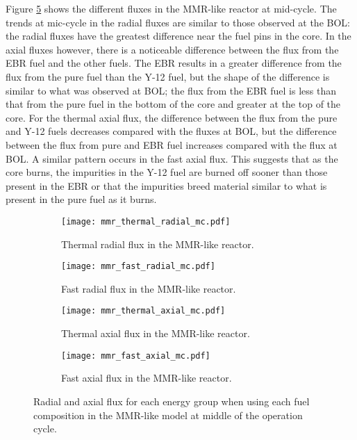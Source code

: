 Figure \ref{fig:mmr_mc} shows the different fluxes in the \gls{MMR}-like 
reactor at mid-cycle. The trends at mic-cycle in the radial fluxes are 
similar to those observed at the \gls{BOL}: the radial fluxes have the 
greatest difference near the fuel pins in the core. In the axial fluxes 
however, there is a noticeable difference between the flux from the \gls{EBR} 
fuel and the other fuels. The \gls{EBR} results in a greater difference 
from the flux from the pure fuel than the Y-12 fuel, but the shape of 
the difference is similar to what was observed at \gls{BOL}; the flux from 
the \gls{EBR} fuel is less than that from the pure fuel in the bottom of 
the core and greater at the top of the core. For the thermal axial flux, 
the difference between the flux from the pure and Y-12 fuels decreases 
compared with the fluxes at \gls{BOL}, but the difference between the flux 
from pure and \gls{EBR} fuel increases compared with the flux at \gls{BOL}. 
A similar pattern occurs in the fast axial flux. This suggests that 
as the core burns, the impurities in the Y-12 fuel are burned off sooner 
than those present in the \gls{EBR} or that the impurities breed material 
similar to what is present in the pure fuel as it burns. 

\begin{figure}
        \centering
        \begin{subfigure}[b]{0.48\textwidth}
            \centering
            \texttt{[image: mmr\_thermal\_radial\_mc.pdf]}
            \caption{Thermal radial flux in the \gls{MMR}-like reactor.}
            \label{fig:mmr_thermal_radial_mc}
        \end{subfigure}
        \hfill
        \begin{subfigure}[b]{0.48\textwidth}
            \centering
            \texttt{[image: mmr\_fast\_radial\_mc.pdf]}
            \caption{Fast radial flux in the \gls{MMR}-like reactor.}
            \label{fig:mmr_fast_radial_mc}
        \end{subfigure}
        \hfill
            
        \begin{subfigure}[b]{0.48\textwidth}
            \centering
            \texttt{[image: mmr\_thermal\_axial\_mc.pdf]}
            \caption{Thermal axial flux in the \gls{MMR}-like reactor. }
            \label{fig:mmr_thermal_axial_mc}
        \end{subfigure}
        \hfill
        \begin{subfigure}[b]{0.48\textwidth}
            \centering
            \texttt{[image: mmr\_fast\_axial\_mc.pdf]}
            \caption{Fast axial flux in the \gls{MMR}-like reactor.}
            \label{fig:mmr_fast_axial_mc}
        \end{subfigure}
        \hfill
        \caption{Radial and axial flux for each energy group when using 
        each fuel composition in the \gls{MMR}-like model at middle of 
        the operation cycle.}
        \label{fig:mmr_mc}
   \end{figure}


